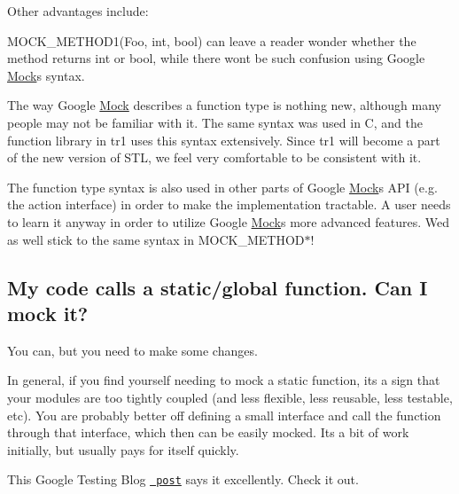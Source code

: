 Other advantages include\+:
\begin{DoxyEnumerate}
\item {\ttfamily M\+O\+C\+K\+\_\+\+M\+E\+T\+H\+O\+D1(\+Foo, int, bool)} can leave a reader wonder whether the method returns {\ttfamily int} or {\ttfamily bool}, while there won\textquotesingle{}t be such confusion using Google \mbox{\hyperlink{class_mock}{Mock}}\textquotesingle{}s syntax.
\end{DoxyEnumerate}
\begin{DoxyEnumerate}
\item The way Google \mbox{\hyperlink{class_mock}{Mock}} describes a function type is nothing new, although many people may not be familiar with it. The same syntax was used in C, and the {\ttfamily function} library in {\ttfamily tr1} uses this syntax extensively. Since {\ttfamily tr1} will become a part of the new version of S\+TL, we feel very comfortable to be consistent with it.
\end{DoxyEnumerate}
\begin{DoxyEnumerate}
\item The function type syntax is also used in other parts of Google \mbox{\hyperlink{class_mock}{Mock}}\textquotesingle{}s A\+PI (e.\+g. the action interface) in order to make the implementation tractable. A user needs to learn it anyway in order to utilize Google \mbox{\hyperlink{class_mock}{Mock}}\textquotesingle{}s more advanced features. We\textquotesingle{}d as well stick to the same syntax in {\ttfamily M\+O\+C\+K\+\_\+\+M\+E\+T\+H\+O\+D$\ast$}!
\end{DoxyEnumerate}

\subsection*{My code calls a static/global function. Can I mock it?}

You can, but you need to make some changes.

In general, if you find yourself needing to mock a static function, it\textquotesingle{}s a sign that your modules are too tightly coupled (and less flexible, less reusable, less testable, etc). You are probably better off defining a small interface and call the function through that interface, which then can be easily mocked. It\textquotesingle{}s a bit of work initially, but usually pays for itself quickly.

This Google Testing Blog \href{http://googletesting.blogspot.com/2008/06/defeat-static-cling.html}\texttt{ post} says it excellently. Check it out.

